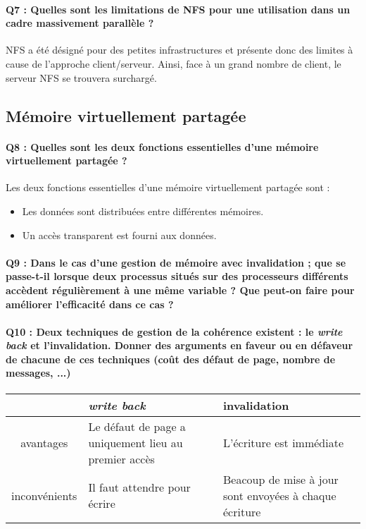 \documentclass[a4paper]{article}
\begin{document}
\paragraph{Q7 : Quelles sont les limitations de NFS pour une utilisation dans un cadre massivement parallèle ?}
NFS a été désigné pour des petites infrastructures et présente donc des limites à cause de l'approche client/serveur. Ainsi, face à un grand nombre de client, le serveur NFS se trouvera surchargé.

\subsection{Mémoire virtuellement partagée}

\paragraph{Q8 : Quelles sont les deux fonctions essentielles d'une mémoire virtuellement partagée ?}
Les deux fonctions essentielles d'une mémoire virtuellement partagée sont :
\begin{itemize}
\item Les données sont distribuées entre différentes mémoires.
\item Un accès transparent est fourni aux données.
\end{itemize}

\paragraph{Q9 : Dans le cas d'une gestion de mémoire avec invalidation ; que se passe-t-il lorsque deux processus situés sur des processeurs différents accèdent régulièrement à une même variable ? Que peut-on faire pour améliorer l'efficacité dans ce cas ?}

\paragraph{Q10 : Deux techniques de gestion de la cohérence existent : le \textit{write back} et l'invalidation. Donner des arguments en faveur ou en défaveur de chacune de ces techniques (coût des défaut de page, nombre de messages, ...)\\}
\begin{tabular}{ | c | p{4.5cm} | p{4.5cm} | }
  \hline
  & \textit{write back} & invalidation  \\ \hline
  avantages & Le défaut de page a uniquement lieu au premier accès  & L'écriture est immédiate \\ \hline
  inconvénients & Il faut attendre pour écrire & Beacoup de mise à jour sont envoyées à chaque écriture \\ \hline
\end{tabular}
\end{document}
